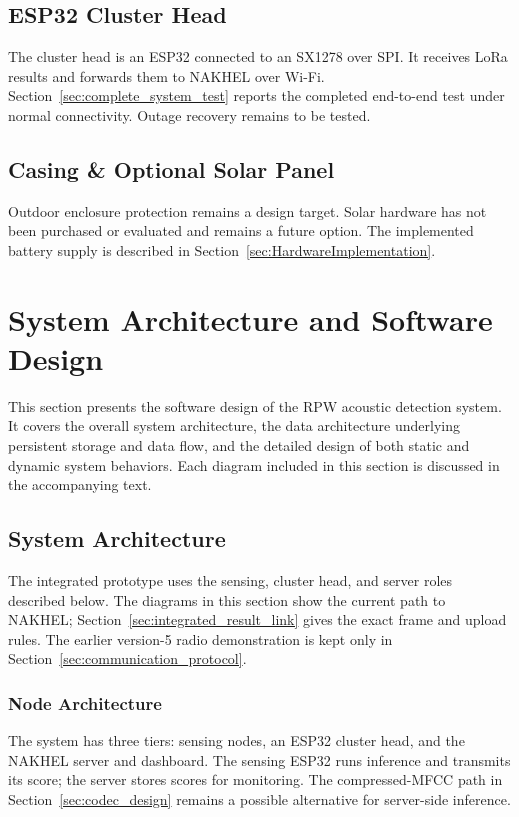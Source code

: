 \documentclass[12pt,a4paper,oneside]{memoir}
\newcommand{\newrevision}[1]{#1}
\begin{document}
\subsection{ESP32 Cluster Head}

\newrevision{The cluster head is an ESP32 connected to an SX1278 over SPI. It receives LoRa results and forwards them to NAKHEL over Wi-Fi. Section~\ref{sec:complete_system_test} reports the completed end-to-end test under normal connectivity. Outage recovery remains to be tested.}


\subsection{Casing \& Optional Solar Panel}

\newrevision{Outdoor enclosure protection remains a design target. Solar hardware has not been purchased or evaluated and remains a future option. The implemented battery supply is described in Section~\ref{sec:HardwareImplementation}.}






\section{\newrevision{System Architecture and Software Design}}

This section presents the software design of the RPW acoustic detection system. It covers the overall system architecture, the data architecture underlying persistent storage and data flow, and the detailed design of both static and dynamic system behaviors. Each diagram included in this section is discussed in the accompanying text.



\subsection{System Architecture}

\newrevision{The integrated prototype uses the sensing, cluster head, and server roles described below. The diagrams in this section show the current path to NAKHEL; Section~\ref{sec:integrated_result_link} gives the exact frame and upload rules. The earlier version-5 radio demonstration is kept only in Section~\ref{sec:communication_protocol}.}

\subsubsection{Node Architecture}
\newrevision{The system has three tiers: sensing nodes, an ESP32 cluster head, and the NAKHEL server and dashboard. The sensing ESP32 runs inference and transmits its score; the server stores scores for monitoring. The compressed-MFCC path in Section~\ref{sec:codec_design} remains a possible alternative for server-side inference.}
\end{document}
